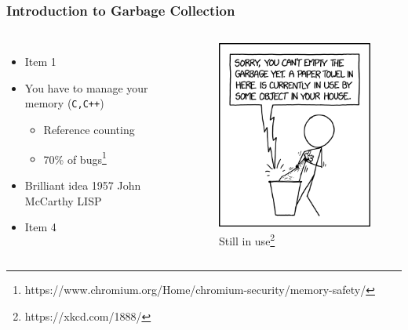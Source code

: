 \documentclass{beamer}
\begin{document}
\begin{frame}

    \frametitle{Introduction to Garbage Collection}
    \begin{columns}
        \begin{itemize}
            \item Item 1
            \item You have to manage your memory (\texttt{C,C++})
            \begin{itemize}
                \item Reference counting 
                \item 70\% of bugs\footnote{https://www.chromium.org/Home/chromium-security/memory-safety/}
            \end{itemize}
            \item Brilliant idea 1957 John McCarthy LISP
            \item Item 4
          \end{itemize}
        
        
        \begin{figure}
            \centering
            \includegraphics[width=\textwidth]{still_in_use.png}
            \caption[xkcd_1888]{Still in use\footnote{https://xkcd.com/1888/}} %
        \end{figure}
        
      \end{columns}

\end{frame}
\end{document}
